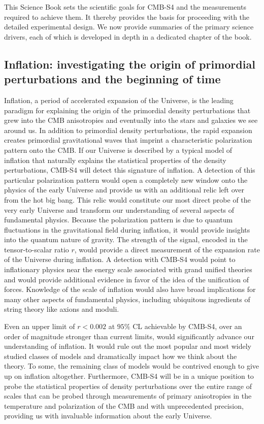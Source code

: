 This Science Book sets the scientific goals for CMB-S4 and the measurements required to achieve them. It thereby provides the basis for proceeding with the detailed experimental design. We now provide summaries of the primary science drivers, each of which is developed in depth in a dedicated chapter of the book.

\subsection*{Inflation: investigating the origin of primordial perturbations and the beginning of time}

Inflation, a period of accelerated expansion of the Universe, is the leading paradigm for explaining the origin of the primordial density perturbations that grew into the CMB anisotropies and eventually into the stars and galaxies we see around us. In addition to primordial density perturbations, the rapid expansion creates primordial gravitational waves that imprint a characteristic polarization pattern onto the CMB. If our Universe is described by a typical model of inflation that naturally explains the statistical properties of the density perturbations, CMB-S4 will detect this signature of inflation. A detection of this particular polarization pattern would open a completely new window onto the physics of the early Universe and provide us with an additional relic left over from the hot big bang. This relic would constitute our most direct probe of the very early Universe and transform our understanding of several aspects of fundamental physics. Because the polarization pattern is due to quantum fluctuations in the gravitational field during inflation, it would provide insights into the quantum nature of gravity. The strength of the signal, encoded in the tensor-to-scalar ratio $r$, would provide a direct measurement of the expansion rate of the Universe during inflation. A detection with CMB-S4 would point to inflationary physics near the energy scale associated with grand unified theories and would provide additional evidence in favor of the idea of the unification of forces. Knowledge of the scale of inflation would also have broad implications for many other aspects of fundamental physics, including ubiquitous ingredients of string theory like axions and moduli.

Even an upper limit of $r<0.002$ at $95\%$ CL achievable by CMB-S4, over an order of magnitude stronger than current limits, would significantly advance our understanding of inflation. It would rule out the most popular and most widely studied classes of models and dramatically impact how we think about the theory. To some, the remaining class of models would be contrived enough to give up on inflation altogether. Furthermore, CMB-S4 will be in a unique position to probe the statistical properties of density perturbations over the entire range of scales that can be probed through measurements of primary anisotropies in the temperature and polarization of the CMB and with unprecedented precision, providing us with invaluable information about the early Universe.

